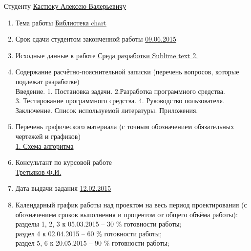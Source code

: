 \documentclass[a4paper,14pt]{extreport}
\begin{document}
	\medskip
	\endcenter
	\raggedright
	Студенту \underline{Кастюку Алексею Валерьевичу}\\
	\begin{enumerate}
	\item Тема работы \underline{Библиотека chart}\\ 
	\item Срок сдачи студентом законченной работы \underline{09.06.2015}
	\item Исходные данные к работе \underline{Среда разработки Sublime text 2. }
	\item Содержание расчётно-пояснительной записки (перечень вопросов, которые подлежат разработке)\\
	\underline{\hspace*{16cm}}\hspace*{-16cm}Введение. 1. Постановка задачи. 2.Разработка программного средства.\\
	\underline{\hspace*{16cm}}\hspace*{-16cm}3. Тестирование программного средства. 4. Руководство пользователя.\\
	\underline{\hspace*{16cm}}\hspace*{-16cm} Заключение. Список используемой литературы. Приложения.\\
	\item Перечень графического материала (с точным обозначением обязательных чертежей и графиков)\\
	\underline{1. Схема алгоритма}
	\item Консультант по курсовой работе\\
	\underline{Третьяков Ф.И.}  
	\item Дата выдачи задания \underline{12.02.2015}
	\item Календарный график работы над проектом на весь период проектирования (с обозначением сроков выполнения и процентом от общего объёма работы):\\ 
	\underline{\hspace*{16cm}}\hspace*{-16cm}разделы 1, 2, 3 к 05.03.2015 – 30 \% готовности работы;\\ 
	\underline{\hspace*{16cm}}\hspace*{-16cm}раздел 4 к 02.04.2015 – 60 \% готовности работы;\\
	\underline{\hspace*{16cm}}\hspace*{-16cm}раздел 5, 6 к 20.05.2015  –  90 \% готовности работы;\\

\end{enumerate}
\end{document}
